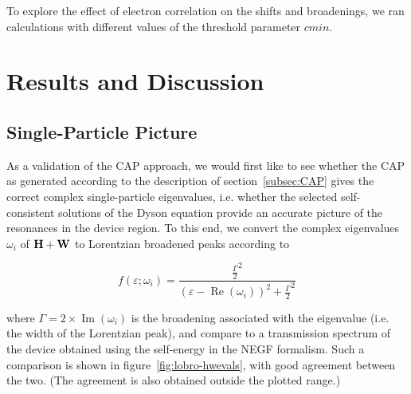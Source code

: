 To explore the effect of electron correlation on the shifts and broadenings, we
ran calculations with different values of the threshold parameter $cmin$.

\section{Results and Discussion}
\label{sec:results}

\subsection{Single-Particle Picture}
\label{subsec:SingleParticle}

As a validation of the \ac{CAP} approach, we would first like to see whether
the \ac{CAP} as generated according to the description of
section~\ref{subsec:CAP} gives the correct complex single-particle eigenvalues,
i.e. whether the selected self-consistent solutions of the Dyson equation
provide an accurate picture of the resonances in the device region. To this
end, we convert the complex eigenvalues $\omega_i$ of $\mathbf{H} + \mathbf{W}$ to
Lorentzian broadened peaks according to

\begin{equation}
	f(\varepsilon;\omega_i)
	= \frac{\frac{\Gamma}{2}^2}
	       {(\varepsilon - \operatorname{Re}(\omega_i))^2
	       + \frac{\Gamma}{2}^2}
	\label{eq:lobro}
\end{equation}

where $\Gamma = 2 \times \operatorname{Im}(\omega_i)$ is the broadening
associated with the eigenvalue (i.e. the width of the Lorentzian peak), and
compare to a transmission spectrum of the device obtained using the self-energy
in the \ac{NEGF} formalism. Such a comparison is shown in
figure~\ref{fig:lobro-hwevals}, with good agreement between the two. (The
agreement is also obtained outside the plotted range.)

